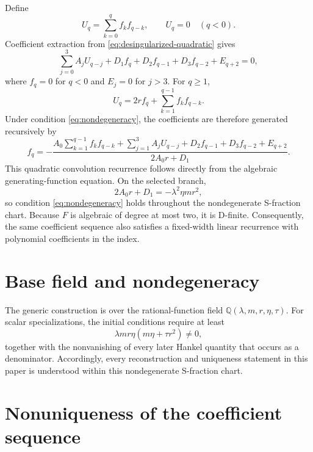 \documentclass[11pt]{article}
\theoremstyle{remark}
\begin{document}
Define
\begin{equation}
 U_q=\sum_{k=0}^{q}f_kf_{q-k},\qquad U_q=0\quad(q<0).
 \label{eq:Uq}
\end{equation}
Coefficient extraction from \eqref{eq:desingularized-quadratic} gives
\begin{equation}
 \sum_{j=0}^{3}A_jU_{q-j}
 +D_1f_q+D_2f_{q-1}+D_3f_{q-2}+E_{q+2}=0,
 \label{eq:convolution}
\end{equation}
where $f_q=0$ for $q<0$ and $E_j=0$ for $j>3$.  For $q\geq1$,
\begin{equation}
 U_q=2rf_q+\sum_{k=1}^{q-1}f_kf_{q-k}.
 \label{eq:Uq-split}
\end{equation}
Under condition \eqref{eq:nondegeneracy}, the coefficients are therefore generated
recursively by
\begin{equation}
 f_q=-\frac{
 A_0\displaystyle\sum_{k=1}^{q-1}f_kf_{q-k}
 +\displaystyle\sum_{j=1}^{3}A_jU_{q-j}
 +D_2f_{q-1}+D_3f_{q-2}+E_{q+2}}
 {2A_0r+D_1}.
 \label{eq:coefficient-recurrence}
\end{equation}
This quadratic convolution recurrence follows directly from the algebraic
generating-function equation.  On the selected branch,
\begin{equation}
 2A_0r+D_1=-\lambda^2\eta mr^2,
 \label{eq:selected-branch-denominator}
\end{equation}
so condition \eqref{eq:nondegeneracy} holds throughout the nondegenerate
S-fraction chart.  Because $F$ is algebraic of degree at most two, it is
D-finite.  Consequently, the same coefficient sequence also satisfies a
fixed-width linear recurrence with polynomial coefficients in the index.

\section{Base field and nondegeneracy}
The generic construction is over the rational-function field
$\mathbb Q(\lambda,m,r,\eta,\tau)$.  For scalar specializations, the initial
conditions require at least
\[
 \lambda mr\eta(m\eta+\tau r^2)\ne0,
\]
together with the nonvanishing of every later Hankel quantity that occurs as
a denominator.  Accordingly, every reconstruction and uniqueness statement
in this paper is understood within this nondegenerate S-fraction chart.

\section{Nonuniqueness of the coefficient sequence}
\label{sec:nonuniqueness}
\end{document}

